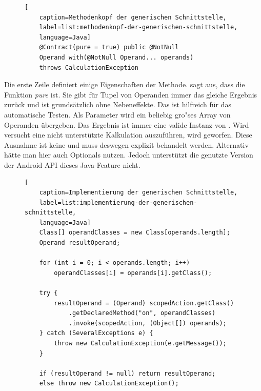 \begin{figure}[bht]
	\begin{lstlisting}[
	caption=Methodenkopf der generischen Schnittstelle,
	label=list:methodenkopf-der-generischen-schnittstelle,
	language=Java]
	@Contract(pure = true) public @NotNull 
	Operand with(@NotNull Operand... operands) 
	throws CalculationException
	\end{lstlisting}    
\end{figure}

Die erste Zeile definiert einige Eigenschaften der Methode.  sagt aus, dass die Funktion \textit{pure} ist. Sie gibt für Tupel von Operanden immer das gleiche Ergebnis zurück und ist grundsätzlich ohne Nebeneffekte. Das ist hilfreich für das automatische Testen. Als Parameter wird ein beliebig gro"ses Array von Operanden übergeben. Das Ergebnis ist immer eine valide Instanz von . Wird versucht eine nicht unterstützte Kalkulation auszuführen, wird  geworfen. Diese Ausnahme ist keine  und muss deswegen explizit behandelt werden. Alternativ hätte man hier auch Optionals nutzen. Jedoch unterstützt die genutzte Version der Android API dieses Java-Feature nicht.

\begin{figure}[bht]
	\begin{lstlisting}[
	caption=Implementierung der generischen Schnittstelle,
	label=list:implementierung-der-generischen-schnittstelle,
	language=Java]
	Class[] operandClasses = new Class[operands.length];
	Operand resultOperand;
	
	for (int i = 0; i < operands.length; i++)
		operandClasses[i] = operands[i].getClass();
	
	try {
		resultOperand = (Operand) scopedAction.getClass()
			.getDeclaredMethod("on", operandClasses)
			.invoke(scopedAction, (Object[]) operands);
	} catch (SeveralExceptions e) {
		throw new CalculationException(e.getMessage());
	}
	
	if (resultOperand != null) return resultOperand;
	else throw new CalculationException();
	\end{lstlisting}    
\end{figure}

